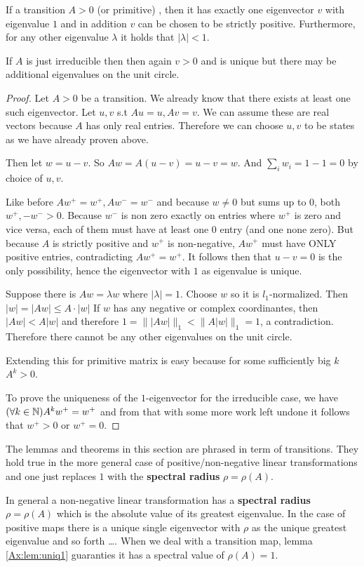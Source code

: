 \begin{lemma}
\label{Ax:lem:uniq1}
If a transition $A \gt 0$ (or primitive)
, then it has exactly
one eigenvector $v$ with eigenvalue $1$ and in addition $v$ can be
chosen to be strictly positive.
Furthermore, for any other eigenvalue
$\lambda$ it holds that $|\lambda| \lt 1$.

If $A$ is just irreducible then then again $v>0$ and is unique but there may be
additional eigenvalues on the unit circle.

\begin{proof}
Let $A \gt 0$ be a transition. We already know that there exists at least one such eigenvector.
Let $u,v$ s.t $Au=u, Av=v$. 
We can assume these are real vectors because $A$ has only real entries.
Therefore we can choose $u,v$
to be states as we have already proven above.

Then let $w=u-v$. So $Aw = A(u-v) = u-v = w$. 
And $\sum_i w_i = 1 - 1 = 0$ by choice of $u,v$.

Like before $Aw^+ = w^+, Aw^- = w^-$
and because $w \neq 0$ but sums up to $0$, both $w^+, -w^- > 0$.
Because $w^-$ is non zero exactly on entries where $w^+$ is zero and vice versa, 
each of them must have at least one $0$ entry (and one none zero). But because
$A$ is strictly positive and $w^+$ is non-negative, $Aw^+$ must have ONLY
positive entries, contradicting $Aw^+ = w^+$. It follows then that $u-v=0$ is
the only possibility, hence the eigenvector with $1$ as eigenvalue is unique.

Suppose there is $Aw = \lambda w$ where $| \lambda|=1$. Choose $w$ so it is
$l_1$-normalized. Then $|w| = |Aw| \leq A \cdot |w|$ If $w$ has any negative or
complex coordinantes, then $|Aw| \lt A|w|$ and therefore 
$1 = \| |Aw| \|_1 \lt \|A|w|\|_1 =1$, a contradiction. Therefore there cannot be
any other eigenvalues on the unit circle.

Extending this for primitive matrix is easy because for some sufficiently big
$k$ $A^k \gt 0$. 

To prove the uniqueness of the $1$-eigenvector for the irreducible case, we have
$(\forall k \in \mathbb{N}) A^kw^+ = w^+$ and from that with some more work left undone
it follows that $w^+ > 0$ or
$w^+ = 0$.
\qedsymbol

\end{proof}
\end{lemma}

\begin{remark}
\label{Ax:remark:rhoisone}
The lemmas and theorems in this section are phrased in term of transitions. They
hold true in the more general case of positive/non-negative
linear transformations and one just replaces $1$ with the \textbf{spectral
radius} $ \rho = \rho(A)$.

In general a non-negative linear transformation has a \textbf{spectral radius}
$\rho = \rho(A)$ which is the absolute value of its greatest eigenvalue. In the case of
positive maps there is a unique single eigenvector with $\rho$ as the unique
greatest eigenvalue and so forth \dots. When we deal with a transition map,
lemma \ref{Ax:lem:uniq1} guaranties 
it has a spectral value of $\rho(A) = 1$.
\end{remark}


